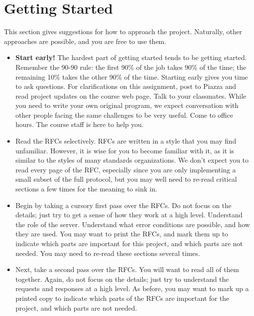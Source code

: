 
\section{Getting Started}
This section gives suggestions for how to approach the project. Naturally, other
approaches are possible, and you are free to use them.

\begin{itemize}
	\item \textbf{Start early!} The hardest part of getting started tends to be
	  getting started. Remember the 90-90 rule: the first 90\% of the job takes
	  90\% of the time; the remaining 10\% takes the other 90\% of the time.
	  Starting early gives you time to ask questions. For clarifications on
	  this assignment, post to Piazza and read project updates on the course
	  web page.  Talk to your classmates. While you need to write your own
	  original program, we expect conversation with other people facing the
	  same challenges to be very useful. Come to office hours. The course staff
	  is here to help you.

	\item Read the RFCs selectively. RFCs are written in a style that you may
      find unfamiliar. However, it is wise for you to become familiar with it,
      as it is similar to the styles of many standards organizations. We don't
      expect you to read every page of the RFC, especially since you are only
      implementing a small subset of the full protocol, but you may well need to
      re-read critical sections a few times for the meaning to sink in.

	\item Begin by taking a cursory first pass over the RFCs. Do not focus on
      the details; just try to get a sense of how they work at a high
      level. Understand the role of the server. Understand what error conditions
      are possible, and how they are used. You may want to print the RFCs, and
      mark them up to indicate which parts are important for this project, and
      which parts are not needed. You may need to re-read these sections several
      times.

	\item Next, take a second pass over the RFCs. You will want to read all of
      them together.  Again, do not focus on the details; just try to understand
      the requests and responses at a high level. As before, you may want to
      mark up a printed copy to indicate which parts of the RFCs are important
      for the project, and which parts are not needed.


\end{itemize}
